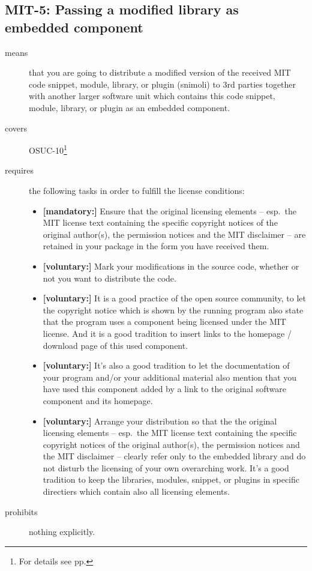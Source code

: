 \subsection{MIT-5: Passing a modified library as embedded component}
\label{OSUC-10-MIT}
\begin{description}
\item[means] that you are going to distribute a modified version of the received
MIT code snippet, module, library, or plugin (snimoli) to 3rd parties together
with another larger software unit which contains this code snippet, module,
library, or plugin as an embedded component.
\item[covers] OSUC-10\footnote{For details see pp. \pageref{OSUC-10-DEF}}
\item[requires] the following tasks in order to fulfill the license conditions:
\begin{itemize}
  \item \textbf{[mandatory:]} Ensure that the original licensing elements -- esp.\
  the MIT license text containing the specific copyright notices of the original
  author(s), the permission notices and the MIT disclaimer -- are retained in
  your package in the form you have received them.
  \item \textbf{[voluntary:]} Mark your modifications in the source code,
  whether or not you want to distribute the code.
  
  \item \textbf{[voluntary:]} It is a good practice of the open source
  community, to let the copyright notice which is shown by the running program
  also state that the program uses a component being licensed under the MIT
  license. And it is a good tradition to insert links to the homepage / download
  page of this used component.

  \item \textbf{[voluntary:]} It's also a good tradition to let the
  documentation of your program and/or your additional material also mention
  that you have used this component added by a link to the original software
  component and its homepage.
  
  \item \textbf{[voluntary:]} Arrange your distribution so that the the original
  licensing elements -- esp.\ the MIT license text containing the specific
  copyright notices of the original author(s), the permission notices and the
  MIT disclaimer --  clearly refer only to the embedded library and do not
  disturb the licensing of your own overarching work. It's a good tradition to
  keep the libraries, modules, snippet, or plugins in specific directiers which
  contain also all licensing elements.
  
\end{itemize}
\item[prohibits] nothing explicitly.
\end{description}

